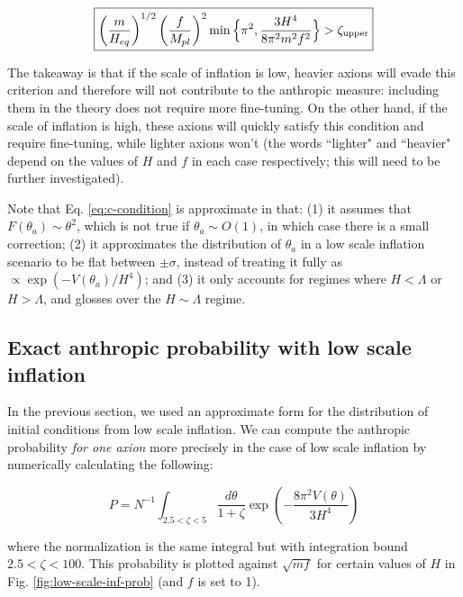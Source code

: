 \documentclass{article}
\begin{document}
\begin{equation}
    \label{eq:c-condition}
    \boxed{\left(\frac{m}{H_{eq}}\right)^{1/2}\left(\frac{f}{M_{pl}}\right)^{2}\min{ \Bigl\{ \pi^2,\frac{3H^4}{8\pi^2m^2f^2}\Bigr\}}>\zeta_\text{upper}}
\end{equation}

The takeaway is that if the scale of inflation is low, heavier axions will evade this criterion and therefore will not contribute to the anthropic measure: including them in the theory does not require more fine-tuning. On the other hand, if the scale of inflation is high, these axions will quickly satisfy this condition and require fine-tuning, while lighter axions won't (the words ``lighter" and ``heavier" depend on the values of $H$ and $f$ in each case respectively; this will need to be further investigated).

Note that Eq. \eqref{eq:c-condition} is approximate in that: (1) it assumes that $F(\theta_a)\sim\theta^2$, which is not true if $\theta_a \sim O(1)$, in which case there is a small correction; (2) it approximates the distribution of $\theta_a$ in a low scale inflation scenario to be flat between $\pm \sigma$, instead of treating it fully as $\propto \exp{\left(-V(\theta_a)/H^4\right)}$; and (3) it only accounts for regimes where $H<\Lambda$ or $H>\Lambda$, and glosses over the $H\sim\Lambda$ regime.

\subsection{Exact anthropic probability with low scale inflation}

In the previous section, we used an approximate form for the distribution of initial conditions from low scale inflation. We can compute the anthropic probability \textit{for one axion} more precisely in the case of low scale inflation by numerically calculating the following:

\begin{equation}
    \label{eq:inflation-prob-1axion}
    P = N^{-1}\int_{2.5<\zeta<5} \frac{d\theta}{1+\zeta} \exp{\left(-\frac{8\pi^2V(\theta)}{3H^4}\right)}
\end{equation}

\noindent where the normalization is the same integral but with integration bound $2.5<\zeta<100$. This probability is plotted against $\sqrt{mf}$ for certain values of $H$ in Fig. \ref{fig:low-scale-inf-prob} (and $f$ is set to 1).
\end{document}
